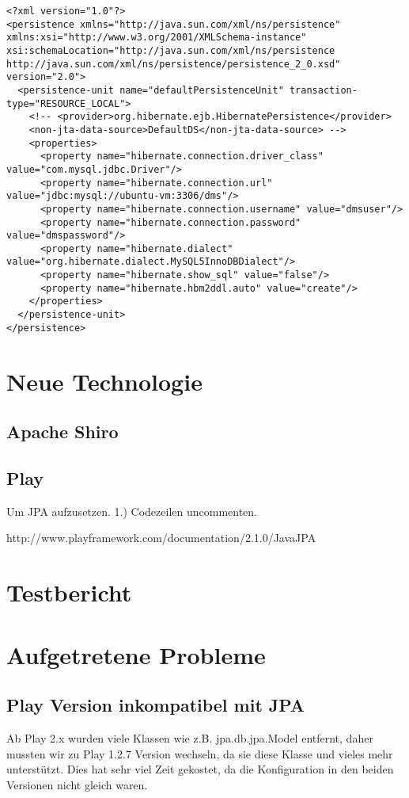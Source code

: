 \documentclass[11pt, a4paper]{article}
\begin{document}
\begin{lstlisting}
<?xml version="1.0"?>
<persistence xmlns="http://java.sun.com/xml/ns/persistence" xmlns:xsi="http://www.w3.org/2001/XMLSchema-instance" xsi:schemaLocation="http://java.sun.com/xml/ns/persistence http://java.sun.com/xml/ns/persistence/persistence_2_0.xsd" version="2.0">
  <persistence-unit name="defaultPersistenceUnit" transaction-type="RESOURCE_LOCAL">
    <!-- <provider>org.hibernate.ejb.HibernatePersistence</provider>
    <non-jta-data-source>DefaultDS</non-jta-data-source> -->
    <properties>
      <property name="hibernate.connection.driver_class" value="com.mysql.jdbc.Driver"/>
      <property name="hibernate.connection.url" value="jdbc:mysql://ubuntu-vm:3306/dms"/>
      <property name="hibernate.connection.username" value="dmsuser"/>
      <property name="hibernate.connection.password" value="dmspassword"/>
      <property name="hibernate.dialect" value="org.hibernate.dialect.MySQL5InnoDBDialect"/>
      <property name="hibernate.show_sql" value="false"/>
      <property name="hibernate.hbm2ddl.auto" value="create"/>
    </properties>
  </persistence-unit>
</persistence>
\end{lstlisting}

\section{Neue Technologie}

\subsection{Apache Shiro}

\subsection{Play}

Um JPA aufzusetzen.
1.) Codezeilen uncommenten.

http://www.playframework.com/documentation/2.1.0/JavaJPA

\section{Testbericht}
\section{Aufgetretene Probleme}
\subsection{Play Version inkompatibel mit JPA}
Ab Play 2.x wurden viele Klassen wie z.B. jpa.db.jpa.Model entfernt, daher mussten wir zu Play 1.2.7 Version wechseln, da sie diese Klasse und vieles mehr unterstützt. Dies hat sehr viel Zeit gekostet, da die Konfiguration in den beiden Versionen nicht gleich waren. 
\end{document}

